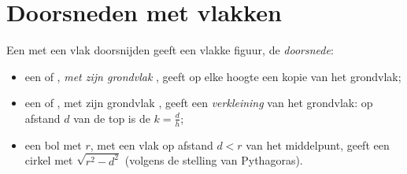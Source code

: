 \section{Doorsneden met vlakken}

\begin{proposition}\label{prop:g9:solids:sections}
Een  met een vlak doorsnijden geeft een vlakke figuur, de
\emph{doorsnede}:
\begin{itemize}
  \item een  of , \emph{ met zijn grondvlak} ,
        geeft op elke hoogte een kopie van het grondvlak;
  \item een  of ,  met zijn grondvlak , geeft een
        \emph{verkleining} van het grondvlak: op afstand $d$ van de top is de
         $k = \frac{d}{h}$;
  \item een bol met  $r$,  met een vlak op afstand $d < r$ van het
        middelpunt, geeft een cirkel met  $\sqrt{r^2 - d^2}$ (volgens de
        stelling van Pythagoras).
\end{itemize}
\end{proposition}
\admitted

